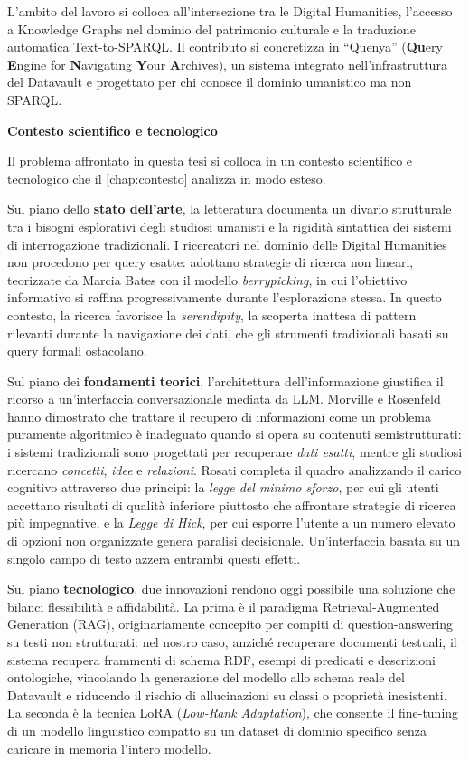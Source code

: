 L'ambito del lavoro si colloca all'intersezione tra le Digital Humanities, l'accesso a Knowledge Graphs nel dominio del patrimonio culturale e la traduzione automatica Text-to-SPARQL\@. Il contributo si concretizza in ``Quenya'' (\textbf{Qu}ery \textbf{E}ngine for \textbf{N}avigating \textbf{Y}our \textbf{A}rchives), un sistema integrato nell'infrastruttura del Datavault e progettato per chi conosce il dominio umanistico ma non SPARQL\@.


\textbf{Contesto scientifico e tecnologico}

Il problema affrontato in questa tesi si colloca in un contesto scientifico e tecnologico che il \cref{chap:contesto} analizza in modo esteso.

Sul piano dello \textbf{stato dell'arte}, la letteratura documenta un divario strutturale tra i bisogni esplorativi degli studiosi umanisti e la rigidità sintattica dei sistemi di interrogazione tradizionali. I ricercatori nel dominio delle Digital Humanities non procedono per query esatte: adottano strategie di ricerca non lineari, teorizzate da Marcia Bates con il modello \textit{berrypicking}\cite{Bat89}, in cui l'obiettivo informativo si raffina progressivamente durante l'esplorazione stessa. In questo contesto, la ricerca favorisce la \textit{serendipity}, la scoperta inattesa di pattern rilevanti durante la navigazione dei dati, che gli strumenti tradizionali basati su query formali ostacolano.

Sul piano dei \textbf{fondamenti teorici}, l'architettura dell'informazione giustifica il ricorso a un'interfaccia conversazionale mediata da LLM\@. Morville e Rosenfeld\cite{Mor08} hanno dimostrato che trattare il recupero di informazioni come un problema puramente algoritmico è inadeguato quando si opera su contenuti semistrutturati: i sistemi tradizionali sono progettati per recuperare \textit{dati esatti}, mentre gli studiosi ricercano \textit{concetti}, \textit{idee} e \textit{relazioni}. Rosati\cite{Ros07} completa il quadro analizzando il carico cognitivo attraverso due principi: la \textit{legge del minimo sforzo}, per cui gli utenti accettano risultati di qualità inferiore piuttosto che affrontare strategie di ricerca più impegnative, e la \textit{Legge di Hick}\cite{Ros07}, per cui esporre l'utente a un numero elevato di opzioni non organizzate genera paralisi decisionale. Un'interfaccia basata su un singolo campo di testo azzera entrambi questi effetti.

Sul piano \textbf{tecnologico}, due innovazioni rendono oggi possibile una soluzione che bilanci flessibilità e affidabilità. La prima è il paradigma Retrieval-Augmented Generation (RAG)\cite{Lew20}, originariamente concepito per compiti di question-answering su testi non strutturati: nel nostro caso, anziché recuperare documenti testuali, il sistema recupera frammenti di schema RDF, esempi di predicati e descrizioni ontologiche, vincolando la generazione del modello allo schema reale del Datavault e riducendo il rischio di allucinazioni su classi o proprietà inesistenti. La seconda è la tecnica LoRA (\textit{Low-Rank Adaptation})\cite{Hu22}, che consente il fine-tuning di un modello linguistico compatto su un dataset di dominio specifico senza caricare in memoria l'intero modello.

